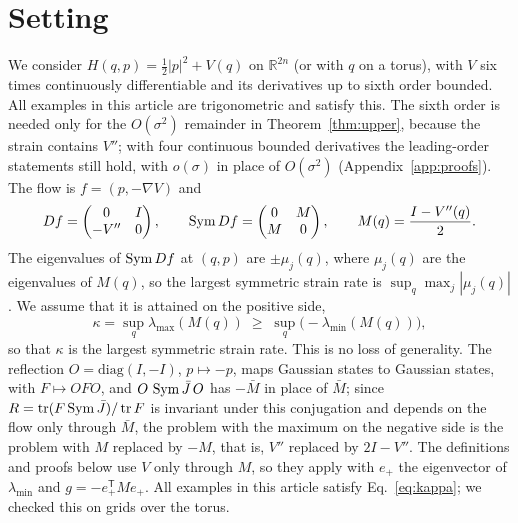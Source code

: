 \section{Setting}
\label{sec:setting}

We consider $H(q,p) = \tfrac12|p|^2 + V(q)$ on $\mathbb R^{2n}$ (or with $q$ on a torus), with $V$ six times continuously differentiable and its derivatives up to sixth order bounded. All examples in this article are trigonometric and satisfy this. The sixth order is needed only for the $O(\sigma^2)$ remainder in Theorem~\ref{thm:upper}, because the strain contains $V''$; with four continuous bounded derivatives the leading-order statements still hold, with $o(\sigma)$ in place of $O(\sigma^2)$ (Appendix~\ref{app:proofs}). The flow is $f = (p, -\nabla V)$ and
\begin{equation}
Df = \begin{pmatrix} 0 & I \\ -V'' & 0 \end{pmatrix}, \qquad
\operatorname{Sym} Df = \begin{pmatrix} 0 & M \\ M & 0 \end{pmatrix}, \qquad M(q) = \frac{I - V''(q)}{2}.
\label{eq:strain}
\end{equation}
The eigenvalues of $\operatorname{Sym} Df$ at $(q,p)$ are $\pm\mu_j(q)$, where $\mu_j(q)$ are the eigenvalues of $M(q)$, so the largest symmetric strain rate is $\sup_q \max_j|\mu_j(q)|$. We assume that it is attained on the positive side,
\begin{equation}
\kappa = \sup_q \lambda_{\max}(M(q)) \;\geq\; \sup_q\big(-\lambda_{\min}(M(q))\big),
\label{eq:kappa}
\end{equation}
so that $\kappa$ is the largest symmetric strain rate. This is no loss of generality. The reflection $O = \mathrm{diag}(I,-I)$, $p \mapsto -p$, maps Gaussian states to Gaussian states, with $F \mapsto OFO$, and $O\,\operatorname{Sym}\bar J\,O$ has $-\bar M$ in place of $\bar M$; since $R = \operatorname{tr}(F\operatorname{Sym}\bar J)/\operatorname{tr} F$ is invariant under this conjugation and depends on the flow only through $\bar M$, the problem with the maximum on the negative side is the problem with $M$ replaced by $-M$, that is, $V''$ replaced by $2I - V''$. The definitions and proofs below use $V$ only through $M$, so they apply with $e_+$ the eigenvector of $\lambda_{\min}$ and $g = -e_+^{\mathsf T}Me_+$. All examples in this article satisfy Eq.~\eqref{eq:kappa}; we checked this on grids over the torus.

